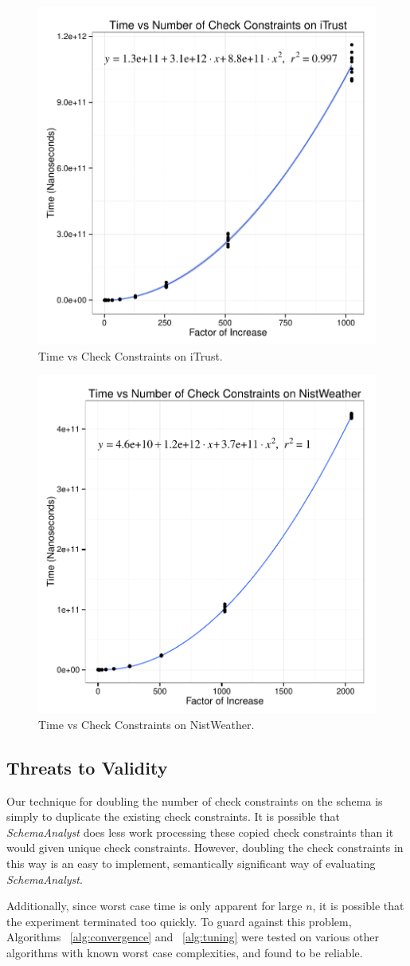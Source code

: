 \documentclass{sig-alternate}
\begin{document}
\begin{figure}
\centering
  \centering
  \includegraphics[width=.5\linewidth]{iTrustChecks.pdf}
  \caption{Time vs Check Constraints on iTrust.}
  \label{fig:iTrust}
\end{figure}
\begin{figure}
  \centering
  \includegraphics[width=.5\linewidth]{NistWeatherChecks.pdf}
  \caption{Time vs Check Constraints on NistWeather.}
  \label{fig:NistWeather}
\end{figure}

\subsection*{Threats to Validity}
Our technique for doubling the number of check constraints on the schema
is simply to duplicate the existing check constraints. It is possible
that \textit{SchemaAnalyst} does less work processing these copied check
constraints than it would given unique check constraints. However,
doubling the check constraints in this way is an easy to implement,
semantically significant way of evaluating \textit{SchemaAnalyst}.

Additionally, since worst case time is only apparent for large $n$, 
it is possible that the experiment terminated too quickly.  To guard 
against this problem, Algorithms ~\ref{alg:convergence} and ~\ref{alg:tuning}
were tested on various other algorithms with known worst case complexities, and 
found to be reliable.
\end{document}
